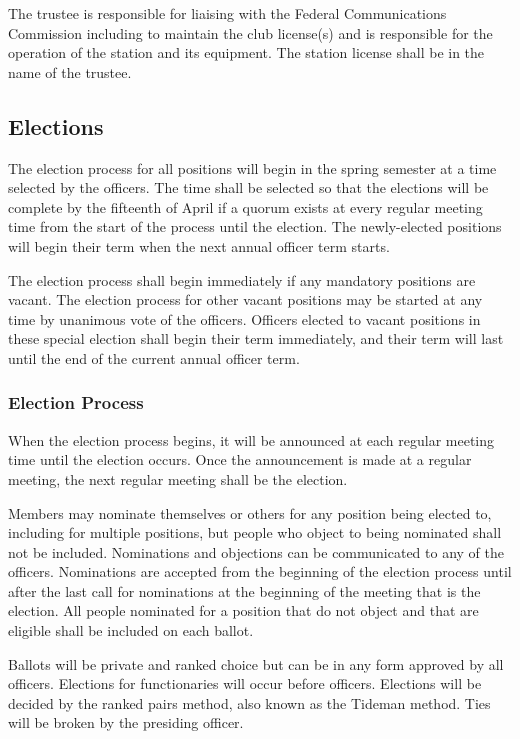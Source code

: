 \documentclass{article}
\begin{document}
The trustee is responsible for liaising with the Federal Communications
Commission including to maintain the club license(s) and is responsible for the
operation of the station and its equipment. The station license shall be in the
name of the trustee.

\subsection{Elections}

The election process for all positions will begin in the spring semester at a
time selected by the officers. The time shall be selected so that the elections
will be complete by the fifteenth of April if a quorum exists at every regular
meeting time from the start of the process until the election. The newly-elected
positions will begin their term when the next annual officer term starts.

The election process shall begin immediately if any mandatory positions are
vacant. The election process for other vacant positions may be started at any
time by unanimous vote of the officers. Officers elected to vacant positions in
these special election shall begin their term immediately, and their term will
last until the end of the current annual officer term.

\subsubsection{Election Process}

When the election process begins, it will be announced at each regular meeting
time until the election occurs. Once the announcement is made at a regular
meeting, the next regular meeting shall be the election.

Members may nominate themselves or others for any position being elected to,
including for multiple positions, but people who object to being nominated shall
not be included. Nominations and objections can be communicated to any of the
officers. Nominations are accepted from the beginning of the election process
until after the last call for nominations at the beginning of the meeting that
is the election. All people nominated for a position that do not object and that
are eligible shall be included on each ballot.

Ballots will be private and ranked choice but can be in any form approved by all
officers. Elections for functionaries will occur before officers. Elections will
be decided by the ranked pairs method, also known as the Tideman method. Ties
will be broken by the presiding officer.
\end{document}
